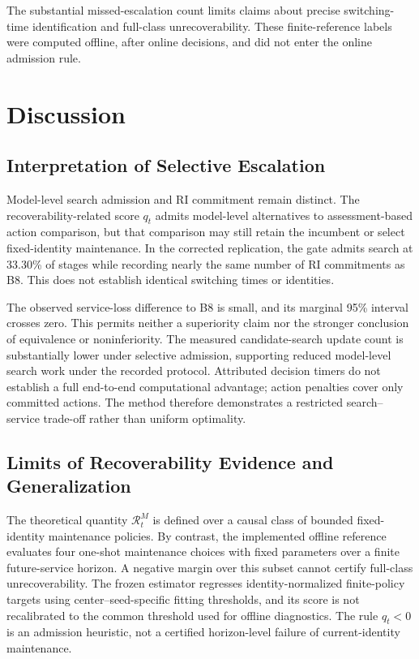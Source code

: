 \documentclass[journal]{IEEEtran}
\begin{document}
The substantial missed-escalation count limits claims about precise
switching-time identification and full-class unrecoverability. These
finite-reference labels were computed offline, after online decisions,
and did not enter the online admission rule.

\FloatBarrier
\section{Discussion}
\subsection{Interpretation of Selective Escalation}
Model-level search admission and RI commitment remain distinct.
The recoverability-related score $q_t$ admits model-level alternatives
to assessment-based action comparison, but that comparison may still
retain the incumbent or select fixed-identity maintenance. In the
corrected replication, the gate admits search at 33.30\% of stages
while recording nearly the same number of RI commitments as B8.
This does not establish identical switching times or identities.

The observed service-loss difference to B8 is small, and its marginal
95\% interval crosses zero. This permits neither a superiority claim
nor the stronger conclusion of equivalence or noninferiority. The
measured candidate-search update count is substantially lower under
selective admission, supporting reduced model-level search work under
the recorded protocol. Attributed decision timers do not establish a
full end-to-end computational advantage; action penalties cover only
committed actions. The method therefore demonstrates a restricted
search--service trade-off rather than uniform optimality.

\subsection{Limits of Recoverability Evidence and Generalization}
The theoretical quantity $\mathcal R_t^M$ is defined over a causal
class of bounded fixed-identity maintenance policies. By contrast,
the implemented offline reference evaluates four one-shot maintenance
choices with fixed parameters over a finite future-service horizon.
A negative margin over this subset cannot certify full-class
unrecoverability. The frozen estimator regresses identity-normalized
finite-policy targets using center--seed-specific fitting thresholds,
and its score is not recalibrated to the common threshold used for
offline diagnostics. The rule $q_t<0$ is an admission heuristic,
not a certified horizon-level failure of current-identity maintenance.
\end{document}
